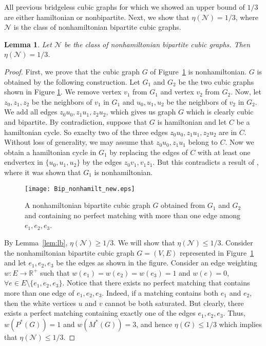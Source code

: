 \documentclass{article}
\newtheorem{lem}[thm]{Lemma}
\newcommand{\RE}{\mathbb{R}}			\newcommand{\ZZ}{\mathbb{Z}}			\newcommand{\OO}{\widetilde{O}}
\newcommand{\NN}{\mathcal{N}}
\begin{document}
All previous bridgeless cubic graphs for which we showed an upper bound of $1/3$ are either hamiltonian or nonbipartite. Next, we show that $\eta(\NN) = 1/3$, where $\NN$ is the class of nonhamiltonian bipartite cubic graphs.

\begin{lem} \label{lem:bipartiteub}
Let $\NN$ be the class of nonhamiltonian bipartite cubic graphs. Then $\eta(\NN) = 1/3$.
\end{lem}
\begin{proof}
First, we prove that the cubic graph $G$ of Figure~\ref{fig:spbn} is nonhamiltonian. $G$ is obtained by the following construction. Let $G_1$ and $G_2$ be the two cubic graphs shown in Figure \ref{fig:spbn}. We remove vertex $v_1$ from $G_1$ and vertex $v_2$ from $G_2$. Now, let $z_0,z_1,z_2$ be the neighbors of $v_1$ in $G_1$ and $u_0,u_1,u_2$ be the neighbors of $v_2$ in $G_2$. We add all edges $z_0u_0,z_1u_1,z_2u_2$, which gives us graph $G$ which is clearly cubic and bipartite. By contradiction, suppose that $G$ is hamiltonian and let $C$ be a hamiltonian cycle. So exaclty two of the three edges $z_0u_0,z_1u_1,z_2u_2$ are in $C$. Without loss of generality, we may assume that $z_0u_0,z_1u_1$ belong to $C$. Now we obtain a hamiltonian cycle in $G_1$ by replacing the edges of $C$ with at least one endvertex in $\{u_0,u_1,u_2\}$ by the edges $z_0v_1,v_1z_1$. But this contradicts a result of \cite{asano82}, where it was shown that $G_1$ is nonhamiltonian.

\begin{figure}[ht!]
\centering
\texttt{[image: Bip\_nonhamilt\_new.eps]}
\caption{A nonhamiltonian bipartite cubic graph $G$ obtained from $G_1$ and $G_2$ and containing no perfect matching with more than one edge among $e_1,e_2,e_3$.}
\label{fig:spbn}
\end{figure}

By Lemma~\ref{lem:lb}, $\eta(\NN) \geq 1/3$. We will show that $\eta(\NN) \leq 1/3$. Consider the nonhamiltonian bipartite cubic graph $G=(V,E)$ represented in Figure~\ref{fig:spbn} and let $e_1,e_2,e_3$ be the edges as shown in the figure.
Consider an edge weighting $w:E\rightarrow \RE^+$ such that $w(e_1)=w(e_2)=w(e_3)=1$ and $w(e)=0$, $\forall e\in E\setminus\{e_1,e_2,e_3\}$. Notice that there exists no perfect matching that contains more than one edge of $e_1,e_2,e_3$. Indeed, if a matching contains both $e_1$ and $e_2$, then the white vertices $u$ and $v$ cannot be both saturated. But clearly, there exists a perfect matching containing exactly one of the edges $e_1,e_2,e_3$. Thus, $w(P^*(G))=1$ and $w(M^*(G))=3$, and hence $\eta(G)\leq 1/3$ which implies that $\eta(\NN)\leq 1/3$.
\end{proof}
\end{document}
